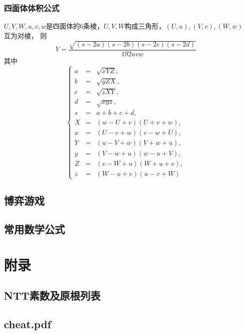 \documentclass[a4paper]{article}
\begin{document}
\subsubsection{四面体体积公式}

$U, V, W, u, v, w$是四面体的$6$条棱，$U, V, W$构成三角形，$(U, u), (V, v), (W, w)$互为对棱，
则$$V = \frac{\sqrt{(s - 2a)(s - 2b)(s - 2c)(s - 2d)}}{192 uvw}$$
其中$$\left\{\begin{array}{lll}
a & = & \sqrt{xYZ}, \\
b & = & \sqrt{yZX}, \\
c & = & \sqrt{zXY}, \\
d & = & \sqrt{xyz}, \\
s & = & a + b + c + d, \\ 
X & = & (w - U + v)(U + v + w), \\
x & = & (U - v + w)(v - w + U), \\
Y & = & (u - V + w)(V + w + u), \\
y & = & (V - w + u)(w - u + V), \\
Z & = & (v - W + u)(W + u + v), \\
z & = & (W - u + v)(u - v + W)
\end{array}\right.$$



\subsection{博弈游戏}

\subsection{常用数学公式}


\section{附录}
\subsection{NTT素数及原根列表}

\subsection{cheat.pdf}

\end{document}
